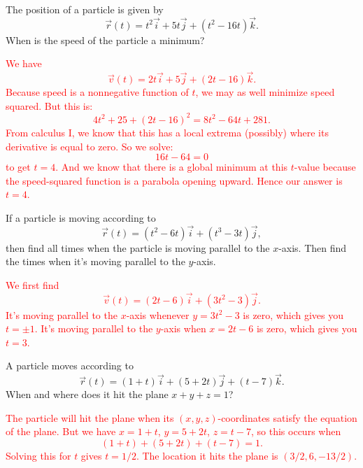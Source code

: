 \documentclass[12pt,reqno]{amsart}
\begin{document}
\bigskip
\prob The position of a particle is given by
	\[\vec{r}(t) = t^2\vec{i}+5t\vec{j}+(t^2-16t)\vec{k}.
	\]
When is the speed of the particle a minimum?

\bigskip
\textcolor{red}{We have
	\[\vec{v}(t) = 2t\vec{i}+5\vec{j}+(2t-16)\vec{k}.
	\]
Because speed is a nonnegative function of $t$, we may as well minimize speed squared. But this is:
	\[4t^2 + 25 + (2t-16)^2 = 8t^2-64t+281.
	\]
From calculus I, we know that this has a local extrema (possibly) where its derivative is equal to zero. So we solve:
	\[16t - 64 = 0
	\]
to get $t=4$. And we know that there is a global minimum at this $t$-value because the speed-squared function is a parabola opening upward. Hence our answer is $t=4$.}

\bigskip
\prob If a particle is moving according to
	\[\vec{r}(t) = (t^2 - 6t)\vec{i}+ (t^3 - 3t)\vec{j},
	\]
then find all times when the particle is moving parallel to the $x$-axis. Then find the times when it's moving parallel to the $y$-axis.

\bigskip
\textcolor{red}{We first find
	\[\vec{v}(t) = (2t-6)\vec{i}+(3t^2-3)\vec{j}.
	\]
It's moving parallel to the $x$-axis whenever $y=3t^2-3$ is zero, which gives you $t=\pm 1$. It's moving parallel to the $y$-axis when $x=2t-6$ is zero, which gives you $t=3$.}

\bigskip
\prob A particle moves according to
	\[\vec{r}(t) = (1+t)\vec{i}+(5+2t)\vec{j}+(t-7)\vec{k}.
	\]
When and where does it hit the plane $x+y+z=1$?

\bigskip
\textcolor{red}{The particle will hit the plane when its $(x,y,z)$-coordinates satisfy the equation of the plane. But we have $x=1+t$, $y=5+2t$, $z=t-7$, so this occurs when
	\[(1+t)+(5+2t)+(t-7) = 1.
	\]
Solving this for $t$ gives $t=1/2$. The location it hits the plane is $(3/2,6,-13/2)$.}
\end{document}

